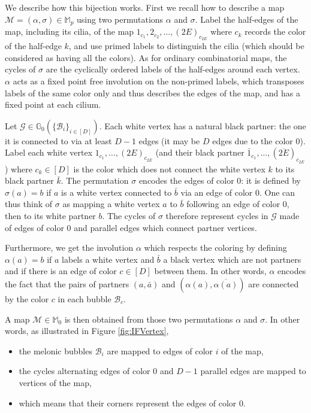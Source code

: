 \documentclass[aps,prd,10pt,notitlepage,nofootinbib,superscriptaddress,showkeys,showpacs]{revtex4-1}
\begin{document}
We describe how this bijection works. First we recall how to describe a map ${\mathcal{M}} = (\alpha, \sigma) \in{\mathbb{M}}_p$ using two permutations $\alpha$ and $\sigma$. Label the half-edges of the map, including its cilia, of the map $1_{c_1}, 2_{c_2}, \dotsc, (2E)_{c_{2E}}$ where $c_k$ records the color of the half-edge $k$, and use primed labels to distinguish the cilia (which should be considered as having all the colors). As for ordinary combinatorial maps, the cycles of $\sigma$ are the cyclically ordered labels of the half-edges around each vertex. $\alpha$ acts as a fixed point free involution on the non-primed labels, which transposes labels of the same color only and thus describes the edges of the map, and has a fixed point at each cilium.

Let ${\mathcal{G}}\in {\mathbb{G}}_0(\{{\mathcal{B}}_i\}_{i\in [D]})$. Each white vertex has a natural black partner: the one it is connected to via at least $D-1$ edges (it may be $D$ edges due to the color 0). Label each white vertex $1_{c_1}, \dotsc, (2E)_{c_{2E}}$ (and their black partner $\bar{1}_{c_1}, \dotsc, (\overline{2E})_{c_{2E}}$) where $c_k\in [D]$ is the color which does not connect the white vertex $k$ to its black partner $\bar{k}$. The permutation $\sigma$ encodes the edges of color 0: it is defined by $\sigma(a) = b$ if $a$ is a white vertex connected to $\bar{b}$ via an edge of color 0. One can thus think of $\sigma$ as mapping a white vertex $a$ to $\bar{b}$ following an edge of color 0, then to its white partner $b$. The cycles of $\sigma$ therefore represent cycles in ${\mathcal{G}}$ made of edges of color 0 and parallel edges which connect partner vertices.

Furthermore, we get the involution $\alpha$ which respects the coloring by defining $\alpha(a)=b$ if $a$ labels a white vertex and $\bar{b}$ a black vertex which are not partners and if there is an edge of color $c\in [D]$ between them. In other words, $\alpha$ encodes the fact that the pairs of partners $(a, \bar{a})$ and $(\alpha(a), \overline{\alpha(a)})$ are connected by the color $c$ in each bubble ${\mathcal{B}}_c$. 

A map ${\mathcal{M}}\in{\mathbb{M}}_0$ is then obtained from those two permutations $\alpha$ and $\sigma$. In other words, as illustrated in Figure \ref{fig:IFVertex},
\begin{itemize}
\item the melonic bubbles ${\mathcal{B}}_i$ are mapped to edges of color $i$ of the map,
\item the cycles alternating edges of color 0 and $D-1$ parallel edges are mapped to vertices of the map,
\item which means that their corners represent the edges of color 0.
\end{itemize}
\end{document}
